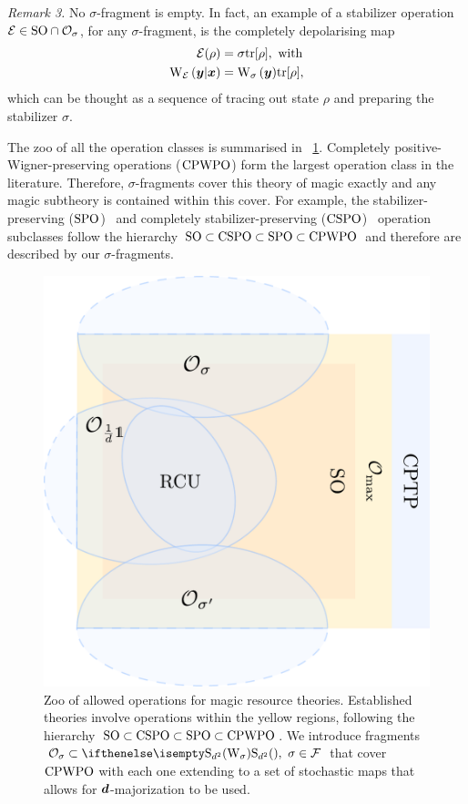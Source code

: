 \emph{Remark 3.} No $\sigma$-fragment is empty.
In fact, an example of a stabilizer operation $\mathcal{E} \in {\rm{SO}} \cap \mathcal{O}_\sigma$, for any $\sigma$-fragment, is the completely depolarising  map
\begin{align}
    \E(\rho) &= \sigma \tr[\rho],\ \text{with} \\
    \W[\bmy|\bmx]{\E} &= \W[\bmy]{\sigma} \tr[\rho],
\end{align}
which can be thought as a sequence of tracing out state $\rho$ and preparing the stabilizer $\sigma$.

The zoo of all the operation classes is summarised in ~\cref{fig:zoo}.
Completely positive-Wigner-preserving operations (${\rm{CPWPO}}$) form the largest operation class in the literature.
Therefore, $\sigma$-fragments cover this theory of magic exactly and any magic subtheory is contained within this cover.
For example, the stabilizer-preserving (${\rm{SPO}}$)~\cite{cit:ahmadi} and completely stabilizer-preserving (${\rm{CSPO}}$)~\cite{cit:seddon} operation subclasses follow the hierarchy ${\rm{SO}} \subset {\rm{CSPO}} \subset {\rm{SPO}} \subset {\rm{CPWPO}}$ and therefore are described by our $\sigma$-fragments.

\begin{figure}[b]
    \centering
        \includegraphics[scale=0.45]{sections/major/operations.pdf}
    \caption{Zoo of allowed operations for magic resource theories.
    Established theories involve operations within the yellow regions, following the hierarchy ${\rm{SO}} \subset {\rm{CSPO}} \subset {\rm{SPO}} \subset {\rm{CPWPO}}$.
    We introduce fragments $\O_\sigma \subset \stochw,\ \sigma \in \F$ that cover ${\rm{CPWPO}}$ with each one extending to a set of stochastic maps that allows for $\bm{d}$-majorization to be used.
    }
    \label{fig:zoo}
\end{figure}